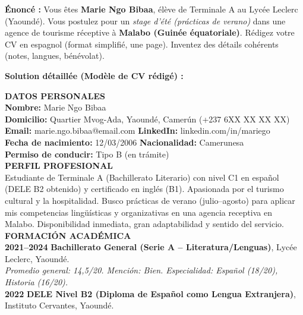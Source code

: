 \documentclass[11pt]{article}
\begin{document}
\begin{exoresolu}
\textbf{Énoncé :} Vous êtes \textbf{Marie Ngo Bibaa}, élève de Terminale A au Lycée Leclerc (Yaoundé). Vous postulez pour un \emph{stage d'été (prácticas de verano)} dans une agence de tourisme réceptive à \textbf{Malabo (Guinée équatoriale)}. Rédigez votre CV en espagnol (format simplifié, une page). Inventez des détails cohérents (notes, langues, bénévolat).

\tcblower

\textbf{Solution détaillée (Modèle de CV rédigé) :}

\begin{textebox}
\textbf{DATOS PERSONALES} \\
\textbf{Nombre:} Marie Ngo Bibaa \\
\textbf{Domicilio:} Quartier Mvog-Ada, Yaoundé, Camerún (+237 6XX XX XX XX) \\
\textbf{Email:} marie.ngo.bibaa@email.com \quad \textbf{LinkedIn:} linkedin.com/in/mariego \\
\textbf{Fecha de nacimiento:} 12/03/2006 \quad \textbf{Nacionalidad:} Camerunesa \\
\textbf{Permiso de conducir:} Tipo B (en trámite) \\

\textbf{PERFIL PROFESIONAL} \\
Estudiante de Terminale A (Bachillerato Literario) con nivel C1 en español (DELE B2 obtenido) y certificado en inglés (B1). Apasionada por el turismo cultural y la hospitalidad. Busco prácticas de verano (julio--agosto) para aplicar mis competencias lingüísticas y organizativas en una agencia receptiva en Malabo. Disponibilidad inmediata, gran adaptabilidad y sentido del servicio. \\

\textbf{FORMACIÓN ACADÉMICA} \\
\textbf{2021--2024} \quad \textbf{Bachillerato General (Serie A -- Literatura/Lenguas)}, Lycée Leclerc, Yaoundé. \\
\quad \textit{Promedio general: 14,5/20. Mención: Bien. Especialidad: Español (18/20), Historia (16/20).} \\
\textbf{2022} \quad \textbf{DELE Nivel B2 (Diploma de Español como Lengua Extranjera)}, Instituto Cervantes, Yaoundé. \\


\end{textebox}
\end{exoresolu}
\end{document}
